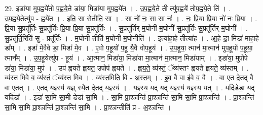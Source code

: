\documentclass[17pt]{extarticle}
\begin{document}
29. इडा॑या मुप॒ह्वये॑तो प॒ह्वये॒ते डा॑या॒ मिडा॑या मुप॒ह्वये॑त । . उ॒प॒ह्वये॒ते ती त्यु॑प॒ह्वये॑ तोप॒ह्वये॒ते ति॑ । . उ॒प॒ह्वये॒तेत्यु॑प - ह्वये॑त । . इति॒ सा सेतीति॒ सा । . सा नो॑ नः॒ सा सा नः॑ । . नः॒ प्रि॒या प्रि॒या नो॑ नः प्रि॒या । . प्रि॒या सु॒प्रतू᳚र्तिः सु॒प्रतू᳚र्तिः प्रि॒या प्रि॒या सु॒प्रतू᳚र्तिः । . सु॒प्रतू᳚र्तिर् म॒घोनी॑ म॒घोनी॑ सु॒प्रतू᳚र्तिः सु॒प्रतू᳚र्तिर् म॒घोनी᳚ । . सु॒प्रतू᳚र्ति॒रिति॑ सु - प्रतू᳚र्तिः । . म॒घोनी तीति॑ म॒घोनी॑ म॒घोनीति॑ । . इत्या॑हा॒हे तीत्या॑ह । . आ॒हे डा॒ मिडा॑ माहा॒हे डा᳚म् । . इडा॑ मे॒वैवे डा॒ मिडा॑ मे॒व । . ए॒वो प॒हूयो॑ प॒हू यै॒वै वोप॒हूय॑ । . उ॒प॒हूया॒ त्मान॑ मा॒त्मान॑ मुप॒हूयो॑ प॒हूया॒ त्मान᳚म् । . उ॒प॒हूयेत्यु॑प - हूय॑ । . आ॒त्मान॒ मिडा॑या॒ मिडा॑या मा॒त्मान॑ मा॒त्मान॒ मिडा॑याम् । . इडा॑या॒ मुपोपे डा॑या॒ मिडा॑या॒ मुप॑ । . उप॑ ह्वयते ह्वयत॒ उपोप॑ ह्वयते । . ह्व॒य॒ते॒ व्य॑स्तं॒ ॅव्य॑स्तꣳ ह्वयते ह्वयते॒ व्य॑स्तम् । . व्य॑स्त मिवे व॒ व्य॑स्तं॒ ॅव्य॑स्त मिव । . व्य॑स्त॒मिति॒ वि - अ॒स्त॒म् । . इ॒व॒ वै वा इ॑वे व॒ वै । . वा ए॒त दे॒तद् वै वा ए॒तत् । . ए॒तद् य॒ज्ञ्स्य॑ य॒ज्ञ् स्यै॒त दे॒तद् य॒ज्ञ्स्य॑ । . य॒ज्ञ्स्य॒ यद् यद् य॒ज्ञ्स्य॑ य॒ज्ञ्स्य॒ यत् । . यदिडेडा॒ यद् यदिडा᳚ । . इडा॑ सा॒मि सा॒मी डेडा॑ सा॒मि । . सा॒मि प्रा॒श्ञन्ति॑ प्रा॒श्ञन्ति॑ सा॒मि सा॒मि प्रा॒श्ञन्ति॑ । . प्रा॒श्ञन्ति॑ सा॒मि सा॒मि प्रा॒श्ञन्ति॑ प्रा॒श्ञन्ति॑ सा॒मि । . प्रा॒श्ञन्तीति॑ प्र - अ॒श्ञन्ति॑ । \newline
\end{document}
